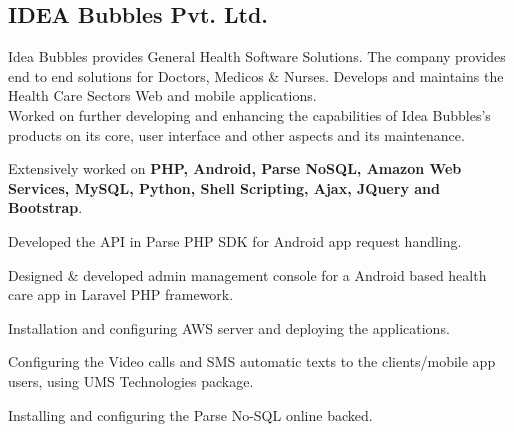 \documentclass[11pt,a4paper,sans]{moderncv}        %
\begin{document}
\subsection{IDEA Bubbles Pvt. Ltd.}
\newline{}
{\begin{changemargin}{2.5cm}{0.0cm} \vspace{-7ex} Idea Bubbles provides General Health Software Solutions. The company provides end to end solutions for Doctors, Medicos & Nurses.  Develops and maintains the Health Care Sectors Web and mobile applications.\newline{}\newline{}%
~\\
{\color{bluecolor}{\large Project Description}}\newline{}
Worked on further developing and enhancing the capabilities of Idea Bubbles's products on its core, user interface and other aspects and its maintenance.\newline{}\newline{}
{\color{bluecolor}{\large Responsibilities}}\end{changemargin}
\begin{cvitemize}%
\item Extensively worked on \textbf{ PHP, Android, Parse NoSQL, Amazon Web Services, MySQL, Python, Shell Scripting, Ajax, JQuery and Bootstrap}.
\item Developed the API in Parse PHP SDK for Android app request handling.
\item Designed & developed admin management console for a Android based health
care app in Laravel PHP framework. 
\item Installation and configuring AWS server and deploying the applications.
\item Configuring the Video calls and SMS automatic texts to the clients/mobile
app users, using UMS Technologies package.
\item Installing and configuring the Parse No-SQL online backed. 
\end{cvitemize}}

~\\
\end{document}
